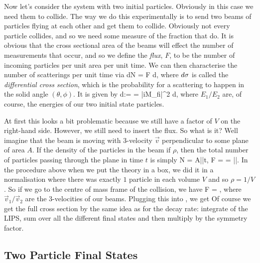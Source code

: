 Now let's consider the system with two initial particles. Obviously in this case we need them to collide. The way we do this experimentally is to send two beams of particles flying at each other and get them to collide. Obviously not every particle collides, and so we need some measure of the fraction that do. It is obvious that the cross sectional area of the beams will effect the number of measurements that occur, and so we define the \textit{flux}, $F$, to be the number of incoming particles per unit area per unit time. We can then characterise the number of scatterings per unit time via 
\bse 
    dN = F d\sig, 
\ese 
where $d\sigma$ is called the \textit{differential cross section}, which is the probability for a scattering to happen in the solid angle $(\theta,\phi)$. It is given by 
\be
\label{eqn:DifferentialCrossSectionOne}
    d\sig :=  =  |iM_{fi}|^2 d\Pi,
\ee 
where $E_1/E_2$ are, of course, the energies of our two initial state particles.

At first this looks a bit problematic because we still have a factor of $V$ on the right-hand side. However, we still need to insert the flux. So what is it? Well imagine that the beam is moving with $3$-velocity $\vec{v}$ perpendicular to some plane of area $A$. If the density of the particles in the beam if $\rho$, then the total number of particles passing through the plane in time $t$ is simply 
\bse 
    N = A||\rho t, \qquad \implies \qquad F =  = ||\rho.
\ese 
In the procedure above when we put the theory in a box, we did it in a normalisation where there was exactly $1$ particle in each volume $V$ and so $\rho=1/V$. So if we go to the centre of mass frame of the collision, we have
\bse 
    F = ,
\ese 
where $\vec{v}_1/\vec{v}_2$ are the $3$-velocities of our beams. Plugging this into , we get 
\noindent Of course we get the full cross section by the same idea as for the decay rate: integrate of the LIPS, sum over all the different final states and then multiply by the symmetry factor. 

\subsection{Two Particle Final States}

